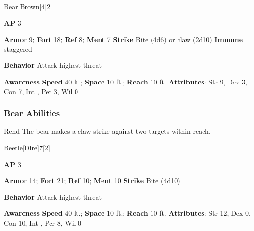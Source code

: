 \begin{monsection}{Bear}[Brown]{4}[2]
\vspace{-1em}\vspace{-1em}
\begin{spellcontent}
\begin{spelltargetinginfo}
{\textbf{AP} 3}

\pari \textbf{Armor} 9;
\textbf{Fort} 18;
\textbf{Ref} 8;
\textbf{Ment} 7
\pari \textbf{Strike} Bite  (4d6) or claw  (2d10)
\pari \textbf{Immune} staggered


\pari \textbf{Behavior} Attack highest threat
\end{spelltargetinginfo}
\end{spellcontent}

\begin{monsterfooter}
\pari \textbf{Awareness} 
\pari \textbf{Speed} 40 ft.;
\textbf{Space} 10 ft.;
\textbf{Reach} 10 ft.
\pari \textbf{Attributes}:
Str 9,
Dex 3,
Con 7,
Int ,
Per 3,
Wil 0
\end{monsterfooter}
\end{monsection}


\subsubsection{Bear Abilities}

\begin{freeability}{Rend}
The bear makes a claw strike against two targets within reach.
\end{freeability}

\begin{monsection}{Beetle}[Dire]{7}[2]
\vspace{-1em}\vspace{-1em}
\begin{spellcontent}
\begin{spelltargetinginfo}
{\textbf{AP} 3}

\pari \textbf{Armor} 14;
\textbf{Fort} 21;
\textbf{Ref} 10;
\textbf{Ment} 10
\pari \textbf{Strike} Bite  (4d10)



\pari \textbf{Behavior} Attack highest threat
\end{spelltargetinginfo}
\end{spellcontent}

\begin{monsterfooter}
\pari \textbf{Awareness} 
\pari \textbf{Speed} 40 ft.;
\textbf{Space} 10 ft.;
\textbf{Reach} 10 ft.
\pari \textbf{Attributes}:
Str 12,
Dex 0,
Con 10,
Int ,
Per 8,
Wil 0
\end{monsterfooter}
\end{monsection}


